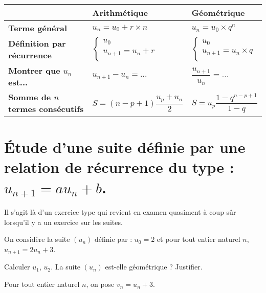 \documentclass[a4paper,12pt]{scrartcl}
\begin{document}
\begin{center}
\begin{tabular}{|l|l|l|}\hline
 & \textbf{Arithmétique}  &    \textbf{Géométrique}     \\\hline
\textbf{Terme général}  & $u_n = u_0 + r \times n$  & $u_n = u_0 \times q^n$ \\\hline
\textbf{Définition par récurrence} & 

$
\left\lbrace
\begin{array}{l }
   u_0  \\
   u_{n+1} = u_n + r \\
\end{array}
\right.
$       
            
            &

$
\left\lbrace
\begin{array}{l }
   u_0  \\
   u_{n+1} = u_n \times q \\
\end{array}
\right.
$ 
            
                       \\\hline
\textbf{\og{}Montrer que $u_n$ est... \fg{}} & $u_{n+1} - u_n = ...$  & $\dfrac{u_{n+1}}{u_n} = ...$ \\\hline
\textbf{Somme de $n$ termes consécutifs} & $S = (n-p+1) \dfrac{u_p+u_n}{2}$ & $S = u_p \dfrac{1-q^{n-p+1}}{1-q}$\\ \hline

\end{tabular}
\end{center}

\section{Étude d'une suite définie par une relation de récurrence du type :  $u_{n+1} = a {u_n + b}$.}

Il s'agit là d'un exercice type qui revient en examen quasiment à coup sûr lorsqu'il y a un exercice sur les suites.

On considère la suite $(u_n)$ définie par :  $u_0  = 2$ et pour tout entier naturel $n$, $u_{n+1} = 2 u_n + 3$.

Calculer $u_1$, $u_2$. La suite $(u_n)$ est-elle géométrique ? Justifier.


Pour tout entier naturel $n$, on pose $v_n = u_n+3$.
\end{document}
